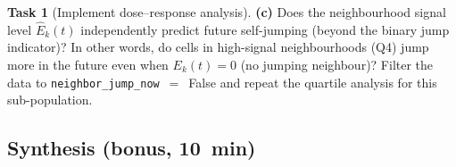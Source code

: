 \documentclass[11pt,a4paper]{article}
\theoremstyle{definition}
\newtheorem{task}{Task}
\newcommand{\expo}[2]{E_{#1}(#2)}
\newcommand{\1}[1]{\mathbf{1}\!\left[#1\right]}
\newcommand{\param}[1]{\texttt{#1}}
\begin{document}
\begin{task}[Implement dose--response analysis]
\noindent\textbf{(c)} Does the neighbourhood signal level $\hat{E}_k(t)$
independently predict future self-jumping (beyond the binary jump indicator)?
In other words, do cells in high-signal neighbourhoods (Q4) jump more in the
future even when $\expo{k}{t}=0$ (no jumping neighbour)?
Filter the data to \param{neighbor\_jump\_now}~$=$~False and repeat
the quartile analysis for this sub-population.


\end{task}

\subsection*{Synthesis (bonus, 10~min)}
\end{document}
